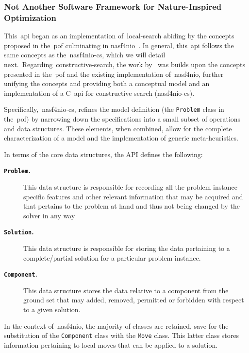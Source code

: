 \subsubsection*{Not Another Software Framework for Nature-Inspired Optimization}

This~\acrshort{api} began as an implementation of~\acrshort{local-search}
abiding by the concepts proposed in the~\acrshort{pof} culminating in
\acrshort{nasf4nio}~\cite{fonseca2021nasf4nio}. In general, this~\acrshort{api}
follows the same concepts as the~\acrshort{nasf4nio-cs}, which we will detail
next.~Regarding~\acrshort{constructive-search}, the work
by~\citet{outeiro2021application} was builds upon the concepts presented in
the~\acrshort{pof} and the existing implementation of~\acrshort{nasf4nio},
further unifying the concepts and providing both a conceptual model and an
implementation of a C~\acrshort{api} for constructive search
(\acrshort{nasf4nio-cs}).

Specifically,~\acrshort{nasf4nio-cs}, refines the model definition (the
\texttt{Problem} class in the~\acrshort{pof}) by narrowing down the
specifications into a small subset of operations and data structures. These
elements, when combined, allow for the complete characterization of a model and
the implementation of generic meta-heuristics.

In terms of the core data structures, the API defines the following:

\begin{description}
      \item[\textbf{\texttt{Problem}.}] This data structure is responsible for recording
            all the problem instance specific features and other relevant information
            that may be acquired and that pertains to the problem at hand and thus not
            being changed by the solver in any way
      \item[\textbf{\texttt{Solution}.}] This data structure is responsible for storing the
            data pertaining to a complete/partial solution for a particular problem
            instance.
      \item[\textbf{\texttt{Component}.}] This data structure stores the data
            relative to a component from the ground set that may added, removed,
            permitted or forbidden with respect to a given solution.
\end{description}

In the context of~\acrshort{nasf4nio}, the majority of classes are retained,
save for the substitution of the \texttt{Component} class with the \texttt{Move}
class. This latter class stores information pertaining to local moves that can
be applied to a solution.

